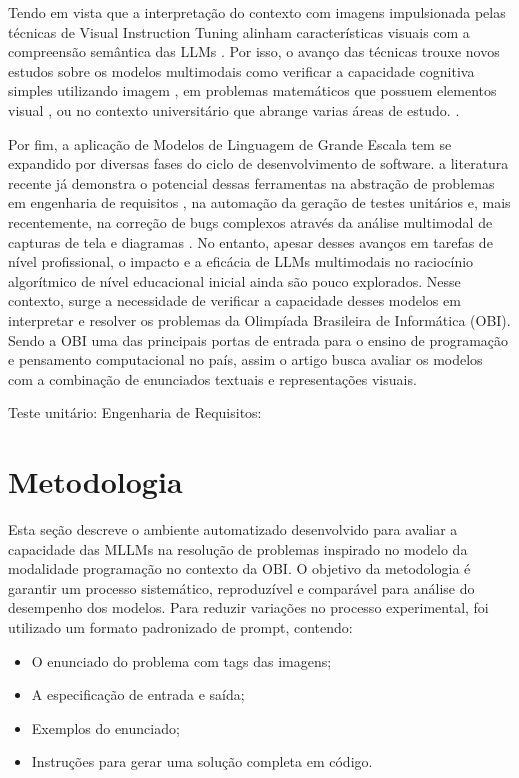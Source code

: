 \documentclass[sigconf,anonymous]{acmart} %
\begin{document}
Tendo em vista que a interpretação do contexto com imagens impulsionada pelas técnicas de Visual Instruction Tuning alinham características visuais com a compreensão semântica das LLMs \cite{Liu2023VisualIT}. Por isso, o avanço das técnicas trouxe novos estudos sobre os modelos multimodais como verificar a capacidade cognitiva simples utilizando imagem \cite{Fu2023MMEAC}, em problemas matemáticos que possuem elementos visual \cite{Lu2023MathVistaEM}, ou no contexto universitário que abrange varias áreas de estudo. \cite{Yue2023MMMUAM}.

Por fim, a aplicação de Modelos de Linguagem de Grande Escala tem se expandido por diversas fases do ciclo de desenvolvimento de software. a literatura recente já demonstra o potencial dessas ferramentas na abstração de problemas em engenharia de requisitos \cite{Mendoza2024Comparative}, na automação da geração de testes unitários \cite{Silva2025LLMs} e, mais recentemente, na correção de bugs complexos através da análise multimodal de capturas de tela e diagramas \cite{Yang2024SWEbenchMD}. No entanto, apesar desses avanços em tarefas de nível profissional, o impacto e a eficácia de LLMs multimodais no raciocínio algorítmico de nível educacional inicial ainda são pouco explorados. Nesse contexto, surge a necessidade de verificar a capacidade desses modelos em interpretar e resolver os problemas da Olimpíada Brasileira de Informática (OBI). Sendo a OBI uma das principais portas de entrada para o ensino de programação e pensamento computacional no país, assim o artigo busca avaliar os modelos com a combinação de enunciados textuais e representações visuais.

Teste unitário: \cite{Silva2025LLMs}
Engenharia de Requisitos: \cite{Mendoza2024Comparative}

\section{Metodologia}

Esta seção descreve o ambiente automatizado desenvolvido para avaliar a capacidade das MLLMs na resolução de problemas inspirado no modelo da modalidade programação no contexto da OBI. O objetivo da metodologia é garantir um processo sistemático, reproduzível e comparável para análise do desempenho dos modelos.
Para reduzir variações no processo experimental, foi utilizado um formato padronizado de prompt, contendo:

\begin{itemize}
    \item O enunciado do problema com tags das imagens;
    \item A especificação de entrada e saída;
    \item Exemplos do enunciado;
    \item Instruções para gerar uma solução completa em código.
\end{itemize}
\end{document}
